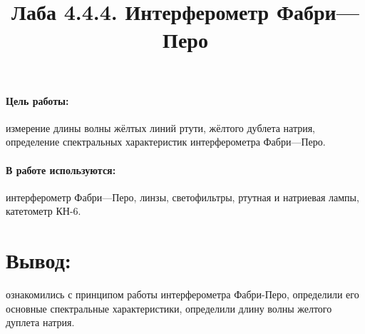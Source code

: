 \documentclass[12pt]{article}
\title{Лаба 4.4.4. Интерферометр Фабри—Перо}
\date{}
\begin{document}
\maketitle

\paragraph{Цель работы:}измерение длины волны жёлтых линий ртути, жёлтого дублета натрия, определение спектральных характеристик интерферометра Фабри—Перо.

\paragraph{В работе используются:}интерферометр Фабри—Перо, линзы, светофильтры, ртутная и натриевая лампы, катетометр КН-6.



\newpage

%
\section*{Вывод:} ознакомились с принципом работы интерферометра Фабри-Перо, определили его основные спектральные характеристики, определили длину волны желтого дуплета натрия.
\end{document}
